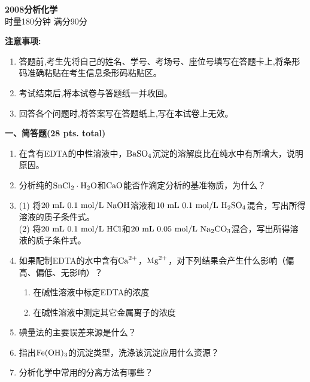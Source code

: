 \begin{center}
    {\LARGE \textbf{2008分析化学}} \\[2ex]
    {\large 时量180分钟 \quad 满分90分}
\end{center}

\vspace{0.5cm}
\noindent\textbf{注意事项:}
\begin{enumerate}[label=\arabic*., parsep=0pt, itemsep=0pt]
    \item 答题前,考生先将自己的姓名、学号、考场号、座位号填写在答题卡上,将条形码准确粘贴在考生信息条形码粘贴区。
    \item 考试结束后,将本试卷与答题纸一并收回。
    \item 回答各个问题时,将答案写在答题纸上,写在本试卷上无效。
\end{enumerate}

\vspace{0.5cm}
\noindent\textbf{一、简答题(28 pts. total)}

\begin{enumerate}[label=\arabic*., itemsep=1.5ex]
    \item 在含有EDTA的中性溶液中，$\ce{BaSO4}$沉淀的溶解度比在纯水中有所增大，说明原因。
    \item 分析纯的$\ce{SnCl2\cdot H2O}$和$\ce{CaO}$能否作滴定分析的基准物质，为什么？
    \item (1) 将$20\ \mathrm{mL}\ 0.1\ \mathrm{mol/L}\ \ce{NaOH}$溶液和$10\ \mathrm{mL}\ 0.1\ \mathrm{mol/L}\ \ce{H2SO4}$混合，写出所得溶液的质子条件式。
    \\
    (2) 将$20\ \mathrm{mL}\ 0.1\ \mathrm{mol/L}\ \ce{HCl}$和$20\ \mathrm{mL}\ 0.05\ \mathrm{mol/L}\ \ce{Na2CO3}$混合，写出所得溶液的质子条件式。
    \item 如果配制EDTA的水中含有$\ce{Ca^{2+}}$，$\ce{Mg^{2+}}$，对下列结果会产生什么影响（偏高、偏低、无影响）？
    \begin{enumerate}[label=(\arabic*), noitemsep, topsep=0pt, partopsep=0pt]
        \item 在碱性溶液中标定EDTA的浓度
        \item 在碱性溶液中测定其它金属离子的浓度
    \end{enumerate}
    \item 碘量法的主要误差来源是什么？
    \item 指出$\ce{Fe(OH)3}$的沉淀类型，洗涤该沉淀应用什么资源？
    \item 分析化学中常用的分离方法有哪些？
\end{enumerate}

